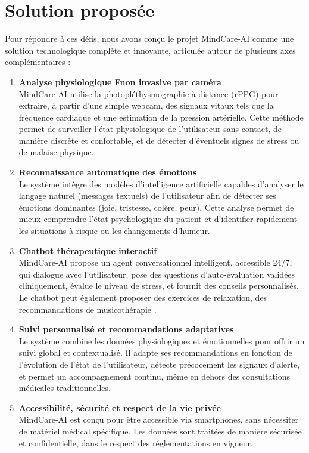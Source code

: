 \section{Solution proposée}
Pour répondre à ces défis, nous avons conçu le projet MindCare-AI comme une solution technologique complète et innovante, articulée autour de plusieurs axes complémentaires :
\begin{enumerate}
    \item \textbf{Analyse physiologique Fnon invasive par caméra} \\ 
    MindCare-AI utilise la photopléthysmographie à distance (rPPG) pour extraire, à partir d’une simple webcam, des signaux vitaux tels que la fréquence cardiaque et une estimation de la pression artérielle. Cette méthode permet de surveiller l’état physiologique de l’utilisateur sans contact, de manière discrète et confortable, et de détecter d’éventuels signes de stress ou de malaise physique.
    \item \textbf{Reconnaissance automatique des émotions} \\ 
    Le système intègre des modèles d’intelligence artificielle capables d’analyser le langage naturel (messages textuels) de l’utilisateur afin de détecter ses émotions dominantes (joie, tristesse, colère, peur). Cette analyse permet de mieux comprendre l’état psychologique du patient et d’identifier rapidement les situations à risque ou les changements d’humeur.
    \item \textbf{Chatbot thérapeutique interactif} \\ 
    MindCare-AI propose un agent conversationnel intelligent, accessible 24/7, qui dialogue avec l’utilisateur, pose des questions d’auto-évaluation validées cliniquement, évalue le niveau de stress, et fournit des conseils personnalisés. Le chatbot peut également proposer des exercices de relaxation, des recommandations de musicothérapie .
    \item \textbf{Suivi personnalisé et recommandations adaptatives} \\ 
    Le système combine les données physiologiques et émotionnelles pour offrir un suivi global et contextualisé. Il adapte ses recommandations en fonction de l’évolution de l’état de l’utilisateur, détecte précocement les signaux d’alerte, et permet un accompagnement continu, même en dehors des consultations médicales traditionnelles.
    \item \textbf{Accessibilité, sécurité et respect de la vie privée} \\ 
    MindCare-AI est conçu pour être accessible via smartphones, sans nécessiter de matériel médical spécifique. Les données sont traitées de manière sécurisée et confidentielle, dans le respect des réglementations en vigueur.
\end{enumerate}

